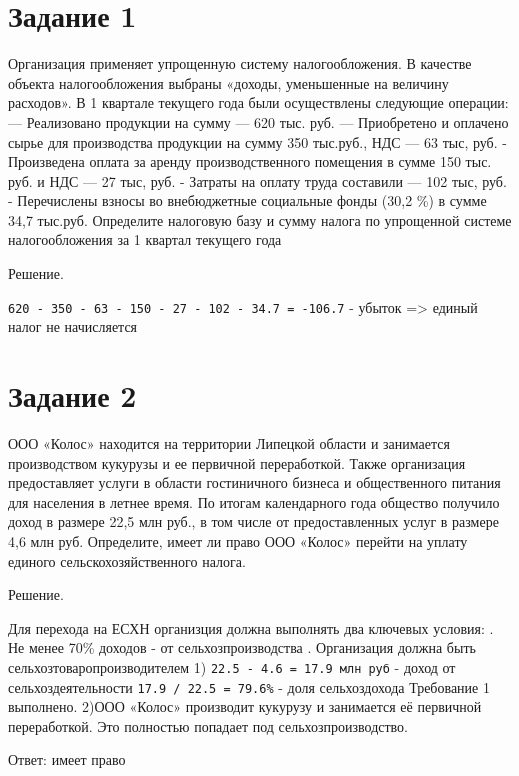 \documentclass[14pt,a4paper]{extarticle}
\begin{document}
\section{Задание 1}
\begin{sloppypar}
Организация применяет упрощенную систему налогообложения. В
качестве объекта налогообложения выбраны «доходы, уменьшенные на величину
расходов». В 1 квартале текущего года были осуществлены следующие операции:
— Реализовано продукции на сумму — 620 тыс. руб.
— Приобретено и оплачено сырье для производства продукции на сумму 350
тыс.руб., НДС — 63 тыс, руб.
- Произведена оплата за аренду производственного помещения в сумме 150 тыс. руб.
и НДС — 27 тыс, руб.
- Затраты на оплату труда составили — 102 тыс, руб.
- Перечислены взносы во внебюджетные социальные фонды (30,2 \%) в сумме 34,7
тыс.руб.
Определите налоговую базу и сумму налога по упрощенной системе
налогообложения за 1 квартал текущего года

Решение.

    \texttt{620 - 350 - 63 - 150 - 27 - 102 - 34.7 = -106.7} - убыток => единый налог не начисляется

\end{sloppypar}

\section{Задание 2}
ООО «Колос» находится на территории Липецкой области и занимается
производством кукурузы и ее первичной переработкой. Также организация предоставляет
услуги в области гостиничного бизнеса и общественного питания для населения в летнее
время. По итогам календарного года общество получило доход в размере 22,5 млн руб., в
том числе от предоставленных услуг в размере 4,6 млн руб. Определите, имеет ли право
ООО «Колос» перейти на уплату единого сельскохозяйственного налога.

Решение.

Для перехода на ЕСХН организция должна выполнять два ключевых условия:
. Не менее 70\% доходов - от сельхозпроизводства
. Организация должна быть сельхозтоваропроизводителем
1) \texttt{22.5 - 4.6 = 17.9 млн руб} - доход от сельхоздеятельности
\texttt{17.9 / 22.5 = 79.6\%} - доля сельхоздохода
Требование 1 выполнено.
2)ООО «Колос» производит кукурузу и занимается её первичной переработкой. Это
полностью попадает под сельхозпроизводство.

Ответ: имеет право
\end{document}

